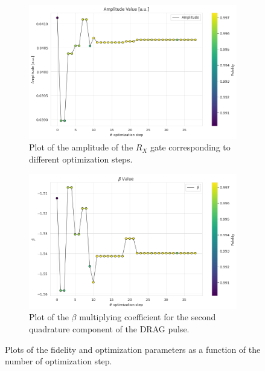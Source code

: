 \begin{figure}[htbp]
    \begin{subfigure}[t]{0.45\textwidth}
        \includegraphics[width=\textwidth]{figures/png/RB_optimization/NM/post_ft_true/NM_amplitude.png}
        \caption{Plot of the amplitude of the $R_X$ gate corresponding to different optimization steps.}
        \label{NM_true_fig:amplitude}
    \end{subfigure}
    \hfill
    \begin{subfigure}[t]{0.45\textwidth}
        \includegraphics[width=\textwidth]{figures/png/RB_optimization/NM/post_ft_true/NM_beta.png}
        \caption{Plot of the $\beta$ multiplying coefficient for the second quadrature component of the DRAG pulse.}
        \label{NM_true_fig:beta}
    \end{subfigure}

    \caption{Plots of the fidelity and optimization parameters as a function of the number of optimization step.}
    \label{fig:NM_plots}
\end{figure}

